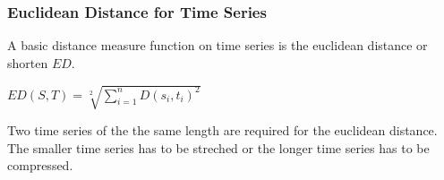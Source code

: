 \subsubsection{Euclidean Distance for Time Series}
A basic distance measure function on time series is the euclidean distance or shorten $ED$.
\begin{center}
    $ED(S, T) = \sqrt[2]{\sum \limits_{i=1}^{n} D(s_i, t_i)^2}$
\end{center}
Two time series of the the same length are required for the euclidean distance. The smaller time series has to be
streched or the longer time series has to be compressed.
